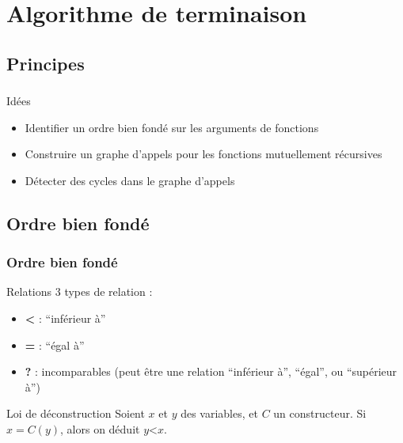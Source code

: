 \section{Algorithme de terminaison}

\subsection{Principes}

\begin{frame}
  \frametitle{}
  \begin{block}{Idées}
    \begin{itemize}
      \item Identifier un ordre bien fondé sur les arguments de fonctions
      \item Construire un graphe d'appels pour les fonctions
        mutuellement récursives
      \item Détecter des cycles dans le graphe d'appels
    \end{itemize}
  \end{block}
\end{frame}

\subsection{Ordre bien fondé}

\begin{frame}
  \frametitle{Ordre bien fondé}
  \begin{block}{Relations}
    3 types de relation :
    \begin{itemize}
    \item \textbf{<} : ``inférieur à''
    \item \textbf{=} : ``égal à''
    \item \textbf{?} : incomparables (peut être une relation ``inférieur à'', ``égal'', ou ``supérieur à'')
    \end{itemize}
  \end{block}
  \begin{block}{Loi de déconstruction}
    Soient $x$ et $y$ des variables, et $C$ un constructeur. Si $x = C(y)$, alors on déduit $y \textbf{<} x$.
  \end{block}
\end{frame}

